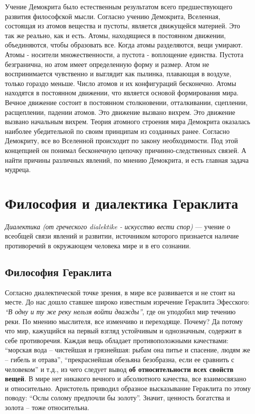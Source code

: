 \documentclass[a4paper, 14pt]{extreport}
\begin{document}
Учение Демокрита было естественным результатом всего предшествующего
развития философской мысли. Согласно учению Демокрита, Вселенная,
состоящая из атомов вещества и пустоты, является движущейся материей.
Это так же реально, как и есть. Атомы, находящиеся в постоянном
движении, объединяются, чтобы образовать все. Когда атомы разделяются,
вещи умирают. Атомы - носители множественности, а пустота - воплощение
единства. Пустота безгранична, но атом имеет определенную форму и
размер. Атом не воспринимается чувственно и выглядит как пылинка,
плавающая в воздухе, только гораздо меньше. Число атомов и их
конфигураций бесконечно. Атомы находятся в постоянном движении, что
является основой формирования мира. Вечное движение состоит в постоянном
столкновении, отталкивании, сцеплении, расщеплении, падении атомов. Это
движение вызвано вихрем. Это движение вызвано начальным вихрем. Теория
атомного строения мира Демокрита оказалась наиболее убедительной по
своим принципам из созданных ранее. Согласно Демокриту, все во Вселенной
происходит по закону необходимости. Под этой концепцией он понимал
бесконечную цепочку причинно-следственных связей. А найти причины
различных явлений, по мнению Демокрита, и есть главная задача мудреца.

\section{Философия и диалектика Гераклита}

\emph{Диалектика (от греческого dialektike - искусство вести
спор)} ---
учение о всеобщей связи явлений и развитии, источником которого
признается наличие противоречий в окружающем человека мире и в его
сознании.


\subsection{Философия Гераклита}

Согласно диалектической точке зрения, в мире все развивается и не стоит
на месте. До нас дошло ставшее широко известным изречение Гераклита
Эфесского: \emph{``В одну и ту же реку нельзя войти дважды''}, где он
уподобил мир течению реки. По мнению мыслителя, все изменчиво и
переходяще. Почему? Да потому что мир, кажущийся на первый взгляд
устойчивым и однозначным, содержит в себе противоречия. Каждая вещь
обладает противоположными качествами: ``морская вода -- чистейшая и
грязнейшая: рыбам она питье и спасение, людям же -- гибель и отрава'',
``прекраснейшая обезьяна безобразна, если ее сравнить с человеком'' и
т.д., из чего следует вывод \textbf{об относительности всех свойств
вещей}. В мире нет никакого вечного и абсолютного качества, все
взаимосвязано и относительно. Аристотель приводил образное высказывание
Гераклита по этому поводу: ``Ослы солому предпочли бы золоту''. Значит,
ценность богатства и золота -- тоже относительна.
\end{document}
